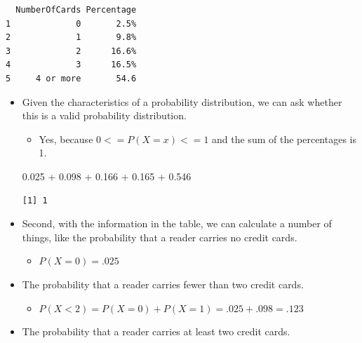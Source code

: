 \documentclass[
  letterpaper,
  DIV=11,
  numbers=noendperiod]{scrreprt}
\newenvironment{Shaded}{\begin{snugshade}}{\end{snugshade}}
\newcommand{\FloatTok}[1]{\textcolor[rgb]{0.68,0.00,0.00}{#1}}
\newcommand{\SpecialCharTok}[1]{\textcolor[rgb]{0.37,0.37,0.37}{#1}}
\providecommand{\tightlist}{%
  \setlength{\itemsep}{0pt}\setlength{\parskip}{0pt}}\usepackage{longtable,booktabs,array}
\begin{document}
\begin{verbatim}
  NumberOfCards Percentage
1             0       2.5%
2             1       9.8%
3             2      16.6%
4             3      16.5%
5     4 or more       54.6
\end{verbatim}

\begin{itemize}
\item
  Given the characteristics of a probability distribution, we can ask
  whether this is a valid probability distribution.

  \begin{itemize}
  \tightlist
  \item
    Yes, because \(0 <= P(X=x) <= 1\) and the sum of the percentages is
    1.
  \end{itemize}

\begin{Shaded}
\begin{Highlighting}[]
\FloatTok{0.025} \SpecialCharTok{+} \FloatTok{0.098} \SpecialCharTok{+} \FloatTok{0.166} \SpecialCharTok{+} \FloatTok{0.165} \SpecialCharTok{+} \FloatTok{0.546}
\end{Highlighting}
\end{Shaded}

\begin{verbatim}
[1] 1
\end{verbatim}
\item
  Second, with the information in the table, we can calculate a number
  of things, like the probability that a reader carries no credit cards.

  \begin{itemize}
  \tightlist
  \item
    \(P(X=0)= .025\)
  \end{itemize}
\item
  The probability that a reader carries fewer than two credit cards.

  \begin{itemize}
  \tightlist
  \item
    \(P(X<2)= P(X=0)+P(X=1)= .025 +.098= .123\)
  \end{itemize}
\item
  The probability that a reader carries at least two credit cards.


\end{itemize}
\end{document}
